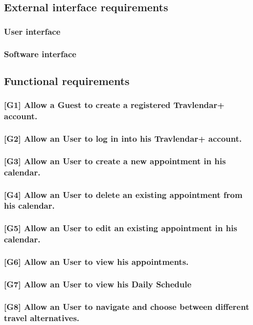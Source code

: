 \subsection{External interface requirements}
\subsubsection{User interface}
\subsubsection{Software interface}
\subsection{Functional requirements}
\subsubsection{[G1] Allow a Guest to create a registered Travlendar+ account.}
\subsubsection{[G2] Allow an User to log in into his Travlendar+ account.}
\subsubsection{[G3] Allow an User to create a new appointment in his calendar.}
\subsubsection{[G4] Allow an User to delete an existing appointment from his calendar.}
\subsubsection{[G5] Allow an User to edit an existing appointment in his calendar.}
\subsubsection{[G6] Allow an User to view his appointments.}
\subsubsection{[G7] Allow an User to view his Daily Schedule}
\subsubsection{[G8] Allow an User to navigate and choose between different travel alternatives.}
